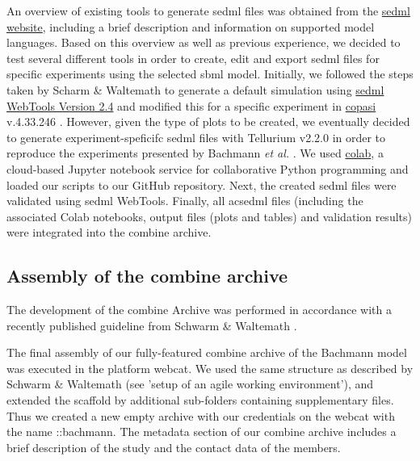 An overview of existing tools to generate \ac{sedml} files was obtained from the \hyperlink{http://sed-ml.org/}{\acs{sedml} website}, including a brief description and information on supported model languages. Based on this overview as well as previous experience, we decided to test several different tools in order to create, edit and export \ac{sedml} files for specific experiments using the selected \ac{sbml} model. 
Initially, we followed the steps taken by Scharm \& Waltemath \cite{combine} to generate a default simulation using \hyperlink{http://sysbioapps.spdns.org/SED-ML_Web_Tools}{\acs{sedml} WebTools Version 2.4} and modified this for a specific experiment in \hyperlink{http://copasi.org/}{\ac{copasi}} v.4.33.246 \cite{copasi}. However, given the type of plots to be created, we eventually decided to generate experiment-speficifc \ac{sedml} files with Tellurium v2.2.0 \cite{tellurium} in order to reproduce the experiments presented by Bachmann \textit{et al.} \cite{bachmannmodel}. We used \hyperlink{https://colab.research.google.com/notebooks/welcome.ipynb}{\ac{colab}}, a cloud-based Jupyter notebook service for collaborative Python programming and loaded our scripts to our GitHub repository. Next, the created \ac{sedml} files were validated using \ac{sedml} WebTools. Finally, all ac{sedml} files (including the associated Colab notebooks, output files (plots and tables) and validation results) were integrated into the \ac{combine} archive.

\subsection*{Assembly of the \acs{combine} archive}

The development of the \ac{combine} Archive was performed in accordance with a recently published guideline from Schwarm \& Waltemath \cite{combine}.

The final assembly of our fully-featured \ac{combine} archive of the Bachmann model was executed in the platform \ac{webcat}. We used the same structure as described by Schwarm \& Waltemath (see 'setup of an agile working environment'), and extended the scaffold by additional sub-folders containing supplementary files. Thus we created a new empty archive with our credentials on the \ac{webcat} with the name \textsf{::bachmann}. The metadata section of our \ac{combine} archive includes a brief description of the study and the contact data of the members.

